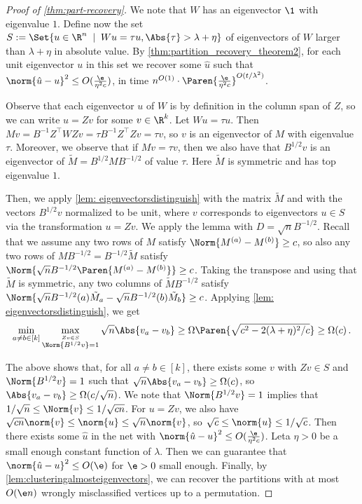 \begin{proof}[Proof of \cref{thm:part-recovery}]
    We note that $W$ has an eigenvector $\1$ with eigenvalue $1$.
    Define now the set $S:=\Set{u \in \R^n\; \mid\; W u = \tau u, \Abs{\tau}>\lambda + \eta}$ of eigenvectors of $W$ larger than $\lambda + \eta$ in absolute value.
    By \cref{thm:partition_recovery_theorem2}, for each unit eigenvector $u$ in this set we recover some $\hat{u}$ such that $\norm{\hat{u}-u}^2 \leq O(\frac{\e}{\eta^2 c})$, in time $n^{O(1)} \cdot \Paren{\frac{\e}{\eta^2 c}}^{O(t/\lambda^2)}$.

    Observe that each eigenvector $u$ of $W$ is by definition in the column span of $Z$, so we can write $u = Z v$ for some $v \in \R^{k}$.
    Let $Wu = \tau u$.
    Then $M v = B^{-1} Z^\top W Z v = \tau B^{-1} Z^\top Z v = \tau v$, so $v$ is an eigenvector of $M$ with eigenvalue $\tau$.
    Moreover, we observe that if $Mv = \tau v$, then we also have that $B^{1/2}v$ is an eigenvector of $\tilde{M} = B^{1/2} M B^{-1/2}$ of value $\tau$.
    Here $\tilde{M}$ is symmetric and has top eigenvalue $1$.

    Then, we apply \cref{lem: eigenvectorsdistinguish} with the matrix $\tilde{M}$ and with the vectors $B^{1/2} v$ normalized to be unit, where $v$ corresponds to eigenvectors $u \in S$ via the transformation $u = Z v$.
    We apply the lemma with $D = \sqrt{n} B^{-1/2}$.
    Recall that we assume any two rows of $M$ satisfy $\Norm{M^{(a)} - M^{(b)}} \geq c$, so also any two rows of $M B^{-1/2} = B^{-1/2} \tilde{M}$ satisfy $\Norm{\sqrt{n}B^{-1/2} \Paren{M^{(a)} - M^{(b)}}} \geq c$.
    Taking the transpose and using that $\tilde{M}$ is symmetric, any two columns of $\tilde{M} B^{-1/2}$ satisfy $\Norm{\sqrt{n}B^{-1/2}(a) \tilde{M}_a - \sqrt{n}B^{-1/2}(b) \tilde{M}_b} \geq c$.
    Applying \cref{lem: eigenvectorsdistinguish}, we get 
    \[\min_{a\neq b\in[k]}\max_{\stackrel{Zv \in S}{\Norm{B^{1/2}v}=1}} \sqrt{n} \Abs{v_a- v_b} \geq \Omega\Paren{\sqrt{c^2 - 2(\lambda+\eta)^2/c}} \geq \Omega(c)\,.\]

    The above shows that, for all $a \neq b \in [k]$, there exists some $v$ with $Zv \in S$ and $\Norm{B^{1/2}v}=1$ such that $\sqrt{n}\Abs{v_a - v_b} \geq \Omega(c)$, so $\Abs{v_a - v_b} \geq \Omega(c/\sqrt{n})$.
    We note that $\Norm{B^{1/2}v} = 1$ implies that $1/\sqrt{n} \leq \Norm{v} \leq 1/\sqrt{c n}$.
    For $u = Z v$, we also have $\sqrt{c n} \norm{v} \leq \norm{u} \leq \sqrt{n} \norm{v}$, so $\sqrt{c} \leq \norm{u} \leq 1/\sqrt{c}$.
    Then there exists some $\hat{u}$ in the net with $\norm{\hat{u} - u}^2 \leq O(\frac{\e}{\eta^2 c})$.
    Leta $\eta > 0$ be a small enough constant function of $\lambda$.
    Then we can guarantee that $\norm{\hat{u} - u}^2 \leq O(\e)$ for $\e > 0$ small enough.
    Finally, by \cref{lem:clusteringalmosteigenvectors}, we can recover the partitions with at most $O(\e n)$ wrongly misclassified vertices up to a permutation.
\end{proof}